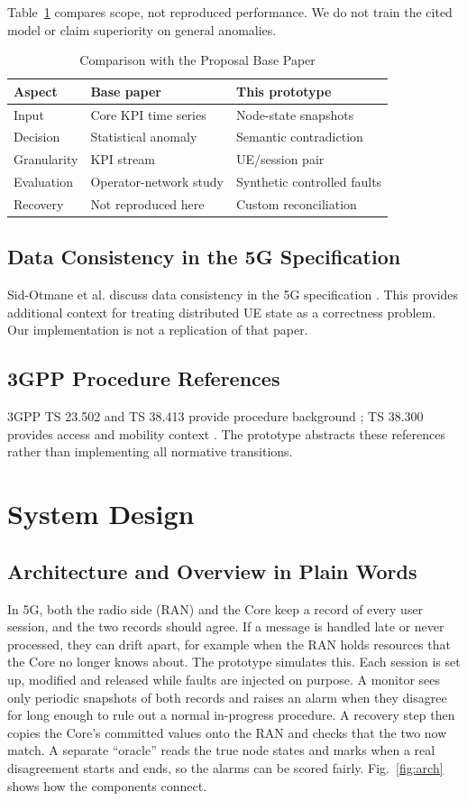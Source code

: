 \documentclass[conference]{IEEEtran}
\begin{document}
Table~\ref{tab:comparison} compares scope, not reproduced performance. We do not train the cited model or claim superiority on general anomalies.
\begin{table}[t]
\caption{Comparison with the Proposal Base Paper}
\label{tab:comparison}\centering\small
\begin{tabular}{p{}p{}p{}}
\toprule Aspect & Base paper \cite{cho} & This prototype\\\midrule
Input & Core KPI time series & Node-state snapshots\\
Decision & Statistical anomaly & Semantic contradiction\\
Granularity & KPI stream & UE/session pair\\
Evaluation & Operator-network study & Synthetic controlled faults\\
Recovery & Not reproduced here & Custom reconciliation\\\bottomrule
\end{tabular}
\end{table}
\subsection{Data Consistency in the 5G Specification}
Sid-Otmane et al. discuss data consistency in the 5G specification \cite{consistency}. This provides additional context for treating distributed UE state as a correctness problem. Our implementation is not a replication of that paper.

\subsection{3GPP Procedure References}
3GPP TS 23.502 and TS 38.413 provide procedure background \cite{procedures,ngap}; TS 38.300 provides access and mobility context \cite{ran}. The prototype abstracts these references rather than implementing all normative transitions.

\section{System Design}
\subsection{Architecture and Overview in Plain Words}
In 5G, both the radio side (RAN) and the Core keep a record of every user session, and the two records should agree. If a message is handled late or never processed, they can drift apart, for example when the RAN holds resources that the Core no longer knows about. The prototype simulates this. Each session is set up, modified and released while faults are injected on purpose. A monitor sees only periodic snapshots of both records and raises an alarm when they disagree for long enough to rule out a normal in-progress procedure. A recovery step then copies the Core's committed values onto the RAN and checks that the two now match. A separate ``oracle'' reads the true node states and marks when a real disagreement starts and ends, so the alarms can be scored fairly. Fig.~\ref{fig:arch} shows how the components connect.
\end{document}
